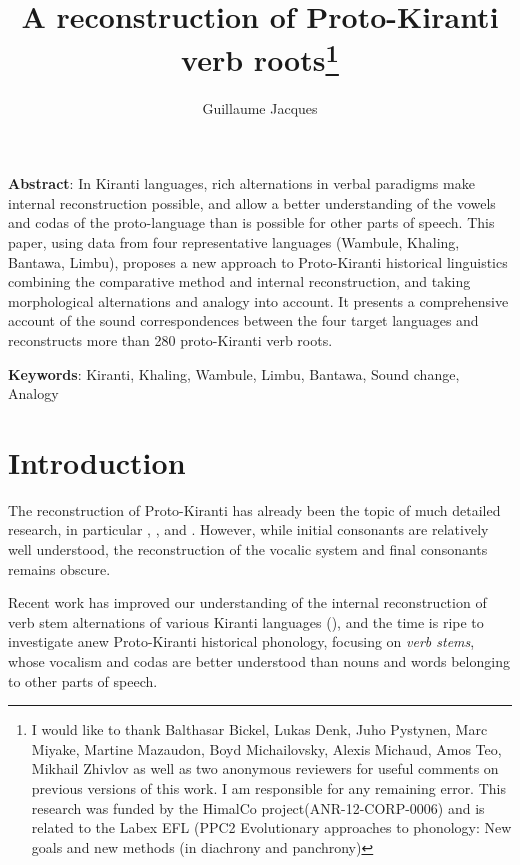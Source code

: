 \documentclass[oneside,a4paper,11pt]{article}
\begin{document}
\title{A reconstruction of Proto-Kiranti verb roots\footnote{I would like to thank Balthasar Bickel, Lukas Denk, Juho Pystynen, Marc Miyake, Martine Mazaudon, Boyd Michailovsky, Alexis Michaud, Amos Teo, Mikhail Zhivlov as well as two anonymous reviewers for useful comments on previous versions of this work. I am responsible for any remaining error. This research was funded by the HimalCo project(ANR-12-CORP-0006) and is related to the Labex EFL (PPC2 Evolutionary approaches to phonology: New goals and new methods (in diachrony and panchrony)}} 
\author{Guillaume Jacques}
\maketitle
\sloppy

\textbf{Abstract}: In Kiranti languages, rich alternations in verbal paradigms make internal reconstruction possible, and allow a better understanding of the vowels and codas of the proto-language than is possible for other parts of speech. This paper, using data from four representative languages (Wambule, Khaling, Bantawa, Limbu), proposes a new approach to Proto-Kiranti historical linguistics combining the comparative method and internal reconstruction, and taking morphological alternations and analogy into account. It presents a comprehensive account of the sound correspondences between the four target languages and reconstructs more than 280 proto-Kiranti verb roots.

\textbf{Keywords}: Kiranti, Khaling, Wambule, Limbu, Bantawa, Sound change, Analogy

 

\section{Introduction}
The reconstruction of Proto-Kiranti has already been the topic of much detailed research, in particular \citet{starostin94kiranti}, \citet{michailovsky94stops}, \citet{opgenort05jero} and \citet{michailovsky10kiranti}. However, while  initial consonants are relatively well understood, the reconstruction of the vocalic system and final consonants remains obscure.  

Recent work has improved our understanding of the internal reconstruction of verb stem alternations of various Kiranti languages (\citealt{michailovsky02dico, lahaussois11thulung, jacques12khaling, michailovsky12dumi}), and the time is ripe to investigate anew Proto-Kiranti historical phonology, focusing on \textit{verb stems}, whose vocalism and codas are better understood than nouns and words belonging to other parts of speech.
\end{document}

